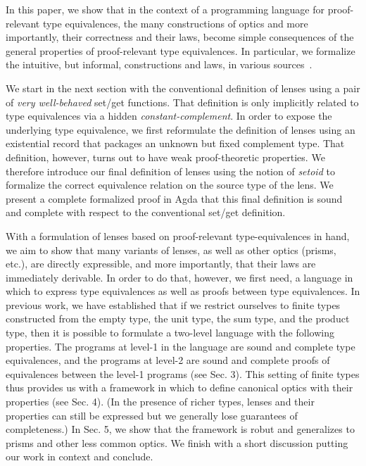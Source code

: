 \documentclass[sigplan,review,anonymous]{acmart}\settopmatter{printfolios=true,printccs=false,printacmref=false}
\begin{document}
In this paper, we show that in the context of a programming language
for proof-relevant type equivalences, the many constructions of optics
and more importantly, their correctness and their laws, become simple
consequences of the general properties of proof-relevant type
equivalences. In particular, we formalize the intuitive, but informal,
constructions and laws, in various
sources~\cite{oleg-blog,Miltner:2017:SBL:3177123.3158089,laarhoven}.

We start in the next section with the conventional definition of
lenses using a pair of \emph{very well-behaved} set/get
functions. That definition is only implicitly related to type
equivalences via a hidden \emph{constant-complement}. In order to
expose the underlying type equivalence, we first reformulate the
definition of lenses using an existential record that packages an
unknown but fixed complement type. That definition, however, turns out
to have weak proof-theoretic properties. We therefore introduce our
final definition of lenses using the notion of \emph{setoid} to
formalize the correct equivalence relation on the source type of the
lens. We present a complete formalized proof in Agda that this final
definition is sound and complete with respect to the conventional
set/get definition.

With a formulation of lenses based on proof-relevant type-equivalences
in hand, we aim to show that many variants of lenses, as well as other
optics (prisms, etc.), are directly expressible, and more importantly,
that their laws are immediately derivable. In order to do that,
however, we first need, a language in which to express type
equivalences as well as proofs between type equivalences. In previous
work, we have established that if we restrict ourselves to finite
types constructed from the empty type, the unit type, the sum type,
and the product type, then it is possible to formulate a two-level
language with the following properties. The programs at level-1 in the
language are sound and complete type equivalences, and the programs at
level-2 are sound and complete proofs of equivalences between the
level-1 programs (see Sec. 3). This setting of finite types thus
provides us with a framework in which to define canonical optics with
their properties (see Sec. 4). (In the presence of richer types,
lenses and their properties can still be expressed but we generally
lose guarantees of completeness.) In Sec. 5, we show that the
framework is robut and generalizes to prisms and other less common
optics. We finish with a short discussion putting our work in context
and conclude.
\end{document}
